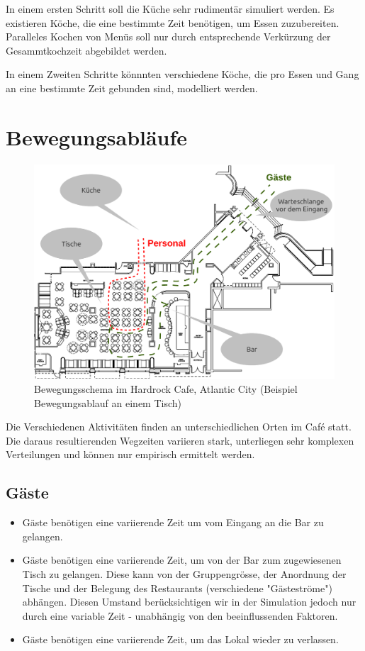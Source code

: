 \documentclass[ngerman,a4paper,12pt]{scrreprt}
\begin{document}
	In einem ersten Schritt soll die Küche sehr rudimentär simuliert werden. Es existieren Köche, die eine bestimmte Zeit benötigen, um Essen zuzubereiten. Paralleles Kochen von Menüs soll nur durch entsprechende Verkürzung der Gesammtkochzeit abgebildet werden.

	In einem Zweiten Schritte könnnten verschiedene Köche, die pro Essen und Gang an eine bestimmte Zeit gebunden sind, modelliert werden.


\section{Bewegungsabläufe}
	\begin{figure}[H]
		\centering
			\includegraphics[width=1\textwidth]{img/hardrockSchema.pdf}
			\caption[Bewegungsschema Hardrock]{Bewegungsschema im Hardrock Cafe, Atlantic City (Beispiel Bewegungsablauf an einem Tisch)}
			\label{schemaHardrock}
	\end{figure}

	Die Verschiedenen Aktivitäten finden an unterschiedlichen Orten im Café statt. Die daraus resultierenden Wegzeiten variieren stark, unterliegen sehr komplexen Verteilungen und können nur empirisch ermittelt werden.

	\subsection{Gäste}
		\begin{itemize}
			\item Gäste benötigen eine variierende Zeit um vom Eingang an die Bar zu gelangen. 
			\item Gäste benötigen eine variierende Zeit, um von der Bar zum zugewiesenen Tisch zu gelangen.
			Diese kann von der Gruppengrösse, der Anordnung der Tische und der Belegung des Restaurants (verschiedene "Gästeströme") abhängen. Diesen Umstand berücksichtigen wir in der Simulation jedoch nur durch eine variable Zeit - unabhängig von den beeinflussenden Faktoren.
			\item Gäste benötigen eine variierende Zeit, um das Lokal wieder zu verlassen.
		\end{itemize}
\end{document}
